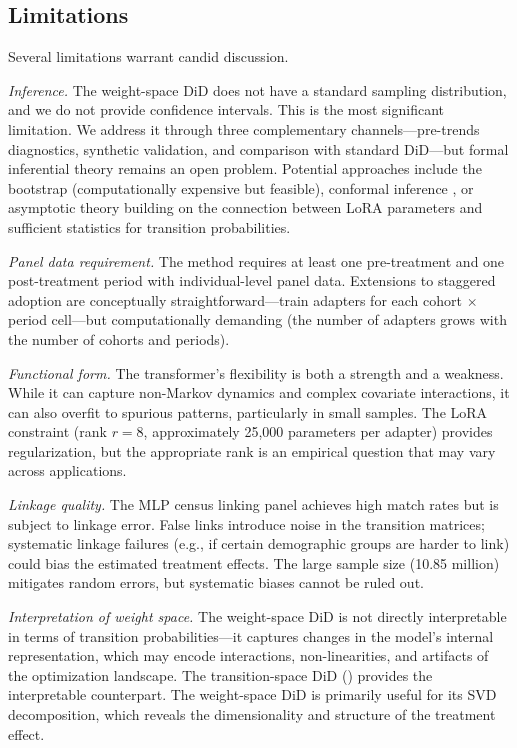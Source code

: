 \documentclass[12pt]{article}
\begin{document}
\subsection{Limitations}

Several limitations warrant candid discussion.

\textit{Inference.} The weight-space DiD does not have a standard sampling distribution, and we do not provide confidence intervals. This is the most significant limitation. We address it through three complementary channels---pre-trends diagnostics, synthetic validation, and comparison with standard DiD---but formal inferential theory remains an open problem. Potential approaches include the bootstrap (computationally expensive but feasible), conformal inference \citep{rambachanRoth2023}, or asymptotic theory building on the connection between LoRA parameters and sufficient statistics for transition probabilities.

\textit{Panel data requirement.} The method requires at least one pre-treatment and one post-treatment period with individual-level panel data. Extensions to staggered adoption \citep{callaway2021difference} are conceptually straightforward---train adapters for each cohort $\times$ period cell---but computationally demanding (the number of adapters grows with the number of cohorts and periods).

\textit{Functional form.} The transformer's flexibility is both a strength and a weakness. While it can capture non-Markov dynamics and complex covariate interactions, it can also overfit to spurious patterns, particularly in small samples. The LoRA constraint (rank $r = 8$, approximately 25,000 parameters per adapter) provides regularization, but the appropriate rank is an empirical question that may vary across applications.

\textit{Linkage quality.} The MLP census linking panel achieves high match rates but is subject to linkage error. False links introduce noise in the transition matrices; systematic linkage failures (e.g., if certain demographic groups are harder to link) could bias the estimated treatment effects. The large sample size (10.85 million) mitigates random errors, but systematic biases cannot be ruled out.

\textit{Interpretation of weight space.} The weight-space DiD is not directly interpretable in terms of transition probabilities---it captures changes in the model's internal representation, which may encode interactions, non-linearities, and artifacts of the optimization landscape. The transition-space DiD () provides the interpretable counterpart. The weight-space DiD is primarily useful for its SVD decomposition, which reveals the dimensionality and structure of the treatment effect.
\end{document}
